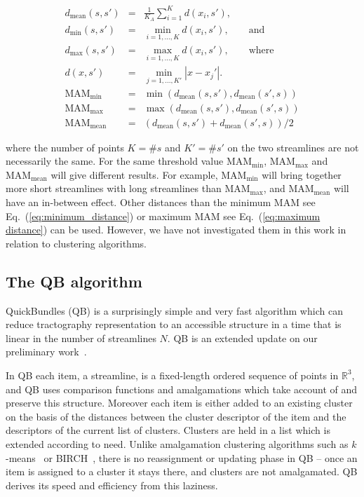\documentclass{bioinfo}
\begin{document}
\begin{methods}
\begin{eqnarray}
d_{\textrm{mean}}(s,s') & = & \frac{1}{K_{A}}\sum_{i=1}^{K}d(x_{i},s'),\nonumber \\
d_{\textrm{min}}(s,s') & = & \min_{i=1,...,K}d(x_{i},s'),\qquad\textrm{and}\label{eq:minimum_distance}\\
d_{\textrm{max}}(s,s') & = & \max_{i=1,...,K }d(x_{i},s'),\qquad\textrm{where}\label{eq:maximum distance}\\
d(x,s') & = & \min_{j=1,...,K'}|x-x_{j}'|.\nonumber \\
\textrm{MAM}_{\textrm{min}} & = & \min(d_{\textrm{mean}}(s,s'),d_{\textrm{mean}}(s',s))\label{eq:min_average_distance}\\
\textrm{MAM}_{\textrm{max}} & = & \max(d_{\textrm{mean}}(s,s'),d_{\textrm{mean}}(s',s))\nonumber \\
\textrm{MAM}_{\textrm{mean}} & = & (d_{\textrm{mean}}(s,s')+d_{\textrm{mean}}(s',s))/2\label{eq:mean_average_distance}\end{eqnarray}


\noindent
where the number of points $K=\#s$ and $K'=\#s'$ on the two streamlines
are not necessarily the same. For the same threshold value
$\textrm{MAM}_{\textrm{min}}$, $\textrm{MAM}_{\textrm{max}}$ and
$\textrm{MAM}_{\textrm{mean}}$ will give different results. For example,
$\textrm{MAM}_{\textrm{min}}$ will bring together more short streamlines
with long streamlines than $\textrm{MAM}_{\textrm{max}}$, and
$\textrm{MAM}_{\textrm{mean}}$ will have an in-between effect.
Other distances than the minimum MAM see
Eq.~(\ref{eq:minimum_distance}) or maximum MAM see
Eq.~(\ref{eq:maximum distance}) can be used.  However, we have not
investigated them in this work in relation to clustering algorithms.

\subsection{The QB algorithm\label{sub:QB-description}}

QuickBundles (QB) is a surprisingly simple and very fast algorithm which
can reduce tractography representation to an accessible structure in a
time that is linear in the number of streamlines $N$. QB is an extended
update on our preliminary work~\citet{EGMB10}.

In QB each item, a streamline, is a fixed-length ordered sequence of
points in $\mathbb{R}^{3}$, and QB uses comparison functions and
amalgamations which take account of and preserve this structure.
Moreover each item is either added to an existing cluster on the basis
of the distances between the cluster descriptor of the item and the
descriptors of the current list of clusters. Clusters are held in a list
which is extended according to need. Unlike amalgamation clustering
algorithms such as $k$-means~\citep{steinhaus1956division,
  macqueen1967some} or BIRCH~\citep{zhang1997birch}, there is no
reassignment or updating phase in QB -- once an item is assigned to a
cluster it stays there, and clusters are not amalgamated. QB derives its
speed and efficiency from this laziness.


\end{methods}
\end{document}
